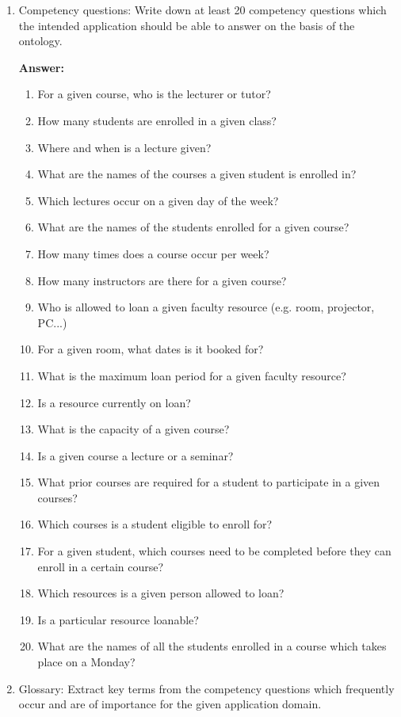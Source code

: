\documentclass[10pt,a4paper]{article}
\begin{document}
\begin{enumerate}
\begin{enumerate}
\item Competency questions: Write down at least 20 competency questions which the intended application should be able to answer on the basis of the ontology.

\textbf{Answer:}

\begin{enumerate}

\item For a given course, who is the lecturer or tutor?
\item How many students are enrolled in a given class?
\item Where and when is a lecture given?
\item What are the names of the courses a given student is enrolled in?
\item Which lectures occur on a given day of the week?
\item What are the names of the students enrolled for a given course?
\item How many times does a course occur per week?
\item How many instructors are there for a given course?
\item Who is allowed to loan a given faculty resource (e.g. room, projector, PC...)
\item For a given room, what dates is it booked for?
\item What is the maximum loan period for a given faculty resource?
\item Is a resource currently on loan?
\item What is the capacity of a given course?
\item Is a given course a lecture or a seminar?
\item What prior courses are required for a student to participate in a given courses?
\item Which courses is a student eligible to enroll for?
\item For a given student, which courses need to be completed before they can enroll in a certain course?
\item Which resources is a given person allowed to loan?
\item Is a particular resource loanable?
\item What are the names of all the students enrolled in a course which takes place on a Monday?
\end{enumerate}

\item Glossary: Extract key terms from the competency questions which frequently occur and are of importance for the given application domain. 


\end{enumerate}
\end{enumerate}
\end{document}
